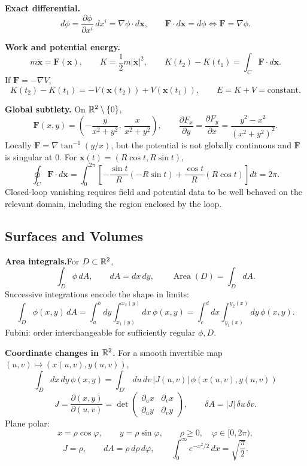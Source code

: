 \noindent\textbf{Exact differential.}
\[
d\phi=\frac{\partial\phi}{\partial x^i}\,dx^i
=\nabla\phi\cdot d\mathbf{x},
\qquad
\mathbf{F}\cdot d\mathbf{x}=d\phi
\Longleftrightarrow \mathbf{F}=\nabla\phi.
\]

\noindent\textbf{Work and potential energy.}
\[
m\ddot{\mathbf{x}}=\mathbf{F}(\mathbf{x}),\qquad
K=\frac12m|\dot{\mathbf{x}}|^2,
\qquad
K(t_2)-K(t_1)=\int_C\mathbf{F}\cdot d\mathbf{x}.
\]
If $\mathbf{F}=-\nabla V$,
\[
K(t_2)-K(t_1)=-V(\mathbf{x}(t_2))+V(\mathbf{x}(t_1)),
\qquad
\boxed{E=K+V=\text{constant}.}
\]

\noindent\textbf{Global subtlety.}\quad
On $\mathbb{R}^2\setminus\{0\}$,
\[
\mathbf{F}(x,y)=
\left(-\frac{y}{x^2+y^2},\,\frac{x}{x^2+y^2}\right),
\qquad
\frac{\partial F_x}{\partial y}=\frac{\partial F_y}{\partial x}
=\frac{y^2-x^2}{(x^2+y^2)^2}.
\]
Locally $\mathbf{F}=\nabla\tan^{-1}(y/x)$, but the potential is not globally
continuous and $\mathbf{F}$ is singular at $0$. For
$\mathbf{x}(t)=(R\cos t,R\sin t)$,
\[
\oint_C\mathbf{F}\cdot d\mathbf{x}
=\int_0^{2\pi}
\left[-\frac{\sin t}{R}(-R\sin t)+
\frac{\cos t}{R}(R\cos t)\right]dt
=2\pi.
\]
Closed-loop vanishing requires field and potential data to be well behaved on the
relevant domain, including the region enclosed by the loop.

\subsection{Surfaces and Volumes}

\noindent\textbf{Area integrals.}\quad For $D\subset\mathbb{R}^2$,
\[
\int_D \phi\,dA,\qquad dA=dx\,dy,\qquad
\operatorname{Area}(D)=\int_D dA .
\]
Successive integrations encode the shape in limits:
\[
\int_D\phi(x,y)\,dA
=\int_a^bdy\int_{x_1(y)}^{x_2(y)}dx\,\phi(x,y)
=\int_c^ddx\int_{y_1(x)}^{y_2(x)}dy\,\phi(x,y).
\]
Fubini: order interchangeable for sufficiently regular $\phi,D$.

\noindent\textbf{Coordinate changes in \texorpdfstring{$\mathbb{R}^2$}{R2}.}
For a smooth invertible map $(u,v)\mapsto(x(u,v),y(u,v))$,
\[
\boxed{\int_D dx\,dy\,\phi(x,y)
=\int_{D'}du\,dv\,|J(u,v)|\,\phi(x(u,v),y(u,v))}
\]
\[
J=\frac{\partial(x,y)}{\partial(u,v)}
=\det\begin{pmatrix}
\partial_u x & \partial_v x\\
\partial_u y & \partial_v y
\end{pmatrix},
\qquad
\delta A=|J|\,\delta u\,\delta v.
\]
Plane polar:
\[
x=\rho\cos\varphi,\qquad y=\rho\sin\varphi,\qquad
\rho\ge0,\quad\varphi\in[0,2\pi),
\]
\[
J=\rho,\qquad \boxed{dA=\rho\,d\rho\,d\varphi},\qquad
\int_0^\infty e^{-x^2/2}\,dx=\sqrt{\frac{\pi}{2}}.
\]

